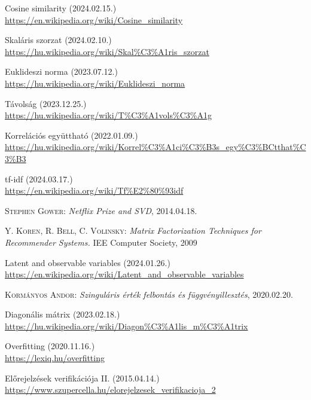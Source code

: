 \documentclass[
]{thesis-ekf}
\theoremstyle{definition}
\theoremstyle{remark}
\begin{document}
\begin{thebibliography}{2}
Cosine similarity (2024.02.15.)
\\\url{https://en.wikipedia.org/wiki/Cosine_similarity}

Skaláris szorzat (2024.02.10.)
\\\url{https://hu.wikipedia.org/wiki/Skal%C3%A1ris_szorzat}

Euklideszi norma (2023.07.12.)
\\\url{https://hu.wikipedia.org/wiki/Euklideszi_norma}

Távolság (2023.12.25.)
\\\url{https://hu.wikipedia.org/wiki/T%C3%A1vols%C3%A1g}
	
Korrelációs együttható (2022.01.09.)
\\\url{https://hu.wikipedia.org/wiki/Korrel%C3%A1ci%C3%B3s_egy%C3%BCtthat%C3%B3}

tf-idf (2024.03.17.)
\\\url{https://en.wikipedia.org/wiki/Tf%E2%80%93idf}

\textsc{Stephen Gower}: \emph{Netflix Prize and SVD}, 2014.04.18.

\textsc{Y. Koren, R. Bell, C. Volinsky}: \emph{Matrix Factorization Techniques for Recommender Systems.} IEE Computer Society, 2009

Latent and observable variables (2024.01.26.)
\\\url{https://en.wikipedia.org/wiki/Latent_and_observable_variables}

\textsc{Kormányos Andor}: \emph{Szinguláris érték felbontás és függvényillesztés}, 2020.02.20.

Diagonális mátrix (2023.02.18.)
\\\url{https://hu.wikipedia.org/wiki/Diagon%C3%A1lis_m%C3%A1trix}

Overfitting (2020.11.16.)
\\\url{https://lexiq.hu/overfitting}

Előrejelzések verifikációja II. (2015.04.14.)
\\\url{https://www.szupercella.hu/elorejelzesek_verifikacioja_2}


\end{thebibliography}
\end{document}
